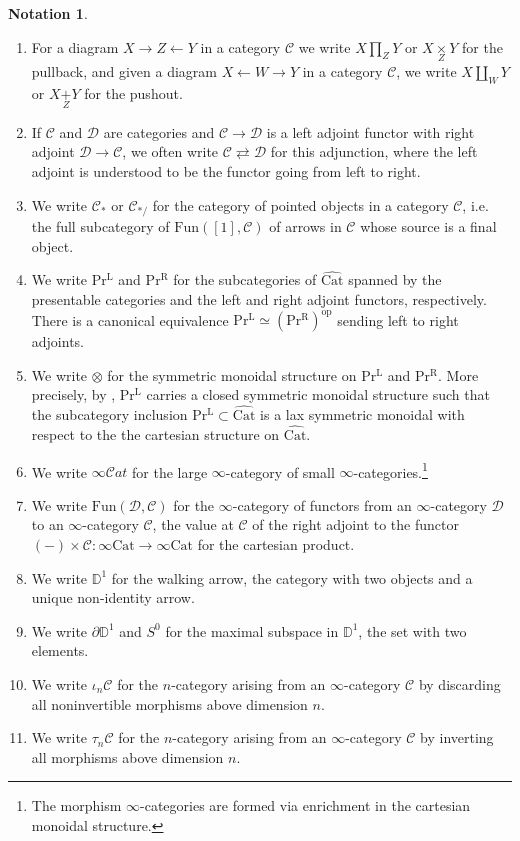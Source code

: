 \documentclass[10pt,oneside]{article}
\numberwithin{equation}{section} %
\numberwithin{figure}{section} %
\theoremstyle{plain}
\theoremstyle{definition}
\newtheorem{notation}[theorem]{Notation}
\newcommand{\bD}{{\mathbb D}}
\newcommand{\mC}{{\mathcal C}}
\newcommand{\mD}{{\mathcal D}}
\newcommand{\op}{\mathrm{op}}
\newcommand{\Cat}{\mathrm{Cat}}
\newcommand{\Fun}{\mathrm{Fun}}
\newcommand{\PrL}{\mathrm{Pr^L}}
\newcommand{\PrR}{\mathrm{Pr^R}}
\newcommand{\scat}{\mathcal{C}\mathit{at}}
\begin{document}
\begin{notation}
\begin{enumerate}[\normalfont(1)]
\item For a diagram $X\to Z\leftarrow Y$ in a category $\mC$ we write $X\underset{Z}{\prod} Y$ or $X\underset{Z}{\times} Y$ for the pullback, and given a diagram $X\leftarrow W\to Y$ in a category $\mC$, we write $X\underset{W}{\coprod} Y$ or $X\underset{Z}{+} Y$ for the pushout.
\item If $\mC$ and $\mD$ are categories and $\mC\to\mD$ is a left adjoint functor with right adjoint $\mD\to\mC$, we often write $\mC\rightleftarrows\mD$ for this adjunction, where the left adjoint is understood to be the functor going from left to right.

\item 
We write $\mC_*$ or $\mC_{\ast/}$ for the category of pointed objects in a category $\mC$, i.e. the full subcategory of $\Fun([1],\mC)$ of arrows in $\mC$ whose source is a final object.

\item We write $\PrL$ and $\PrR$ for the subcategories of $\widehat{\Cat}$ spanned by the presentable categories and the left and right adjoint functors, respectively.
There is a canonical equivalence $\PrL \simeq (\PrR)^\op$
sending left to right adjoints.
\item We write $\otimes$ for the symmetric monoidal structure on $\PrL$ and $\PrR$.
More precisely, by \cite{lurie.higheralgebra}, $\PrL$ carries a closed symmetric monoidal structure such that the subcategory inclusion $\PrL \subset \widehat{\Cat}$ is a lax symmetric monoidal with respect to the the cartesian structure on $\widehat{\Cat}$.
\item We write $\infty\scat$ for the large $\infty$-category of small $\infty$-categories.\footnote{The morphism $\infty$-categories are formed via enrichment in the cartesian monoidal structure.}
\item We write $\Fun(\mD,\mC)$ for the $\infty$-category of functors from an $\infty$-category $\mD$ to an $\infty$-category $\mC$, the value at $\mC$ of the right adjoint to the functor $(-)\times\mC:\infty\Cat\to\infty\Cat$ for the cartesian product.

\item We write $\bD^1$ for the walking arrow, the category with two objects and a unique non-identity arrow.
\item We write $\partial\bD^1$ and $S^0$ for the maximal subspace in $\bD^1$, the set with two elements.

\item We write $\iota_{n}\mC$ for the $n$-category arising from an $\infty$-category $\mC$ by discarding all noninvertible morphisms above dimension $n.$
\item We write $\tau_{n}\mC$ for the $n$-category arising from an $\infty$-category $\mC$ by inverting all morphisms above dimension $n.$
\end{enumerate}
\end{notation} 
\end{document}
